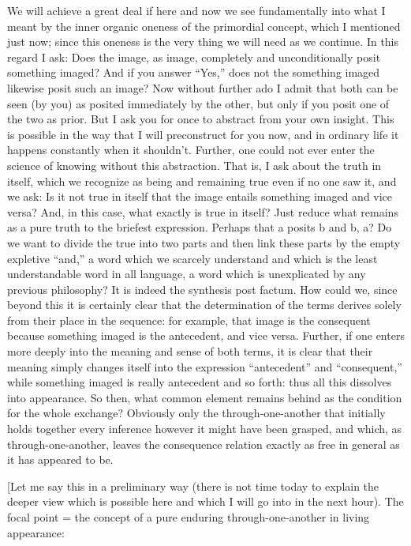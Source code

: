 We will achieve a great deal if here and now
we see fundamentally into what I meant
by the inner organic oneness
of the primordial concept,
which I mentioned just now;
since this oneness is the very thing
we will need as we continue.
In this regard I ask:
Does the image, as image,
completely and unconditionally
posit something imaged?
And if you answer “Yes,”
does not the something imaged
likewise posit such an image?
Now without further ado I admit
that both can be seen (by you)
as posited immediately by the other,
but only if you posit one of the two as prior.
But I ask you for once to abstract from your own insight.
This is possible in the way
that I will preconstruct for you now,
and in ordinary life it happens
constantly when it shouldn’t.
Further, one could not ever enter
the science of knowing without this abstraction.
That is, I ask about the truth in itself,
which we recognize as being and remaining true
even if no one saw it, and we ask:
Is it not true in itself that
the image entails something imaged
and vice versa?
And, in this case,
what exactly is true in itself?
Just reduce what remains as
a pure truth to the briefest expression.
Perhaps that a posits b and b, a?
Do we want to divide the true into two parts
and then link these parts
by the empty expletive “and,”
a word which we scarcely understand
and which is the least understandable word in all language,
a word which is unexplicated by any previous philosophy?
It is indeed the synthesis post factum.
How could we, since beyond this it is certainly clear
that the determination of the terms derives
solely from their place in the sequence:
for example, that image is the consequent
because something imaged is the antecedent,
and vice versa.
Further, if one enters more deeply into the
meaning and sense of both terms,
it is clear that their meaning simply changes itself
into the expression “antecedent” and “consequent,”
while something imaged is really antecedent and so forth:
thus all this dissolves into appearance.
So then, what common element remains behind
as the condition for the whole exchange?
Obviously only the through-one-another that
initially holds together every inference
however it might have been grasped,
and which, as through-one-another,
leaves the consequence relation exactly
as free in general as it has appeared to be.

[Let me say this in a preliminary way
(there is not time today to explain the
deeper view which is possible here and
which I will go into in the next hour).
The focal point = the concept of
a pure enduring through-one-another
in living appearance:

